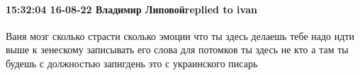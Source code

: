  
 
 
 
 

\paragraph{15:32:04 16-08-22 Владимир Липовойreplied to ivan}

Ваня мозг сколько страсти сколько эмоции что ты здесь делаешь тебе надо идти
выше к зенескому записывать его слова для потомков ты здесь не кто а там ты
будешь с должностью запигдень это с украинского писарь
